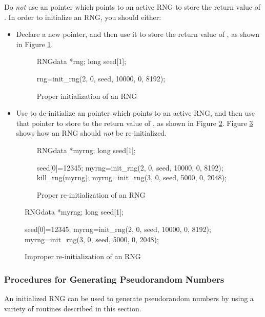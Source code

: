 Do {\em not} use an  pointer which points to an active RNG
to store the return value of .  In order to initialize an
RNG, you should either:
\begin{itemize}
\item Declare a new  pointer, and then use it to store the
return value of , as shown in Figure \ref{fig:properinit}.

\begin{figure}
\begin{example}
RNGdata *rng;
long seed[1];

rng=init_rng(2, 0, seed, 10000, 0, 8192);
\end{example}
\caption{Proper initialization of an RNG}
\label{fig:properinit}
\end{figure}

\item Use  to de-initialize an  pointer
which points to an active RNG, and then use that pointer to store to the
return value of , as shown in Figure
\ref{fig:properreinit}.  Figure \ref{fig:improperreinit} shows how an
RNG should {\em not} be re-initialized.
\begin{figure}
\begin{example}
RNGdata *myrng;
long seed[1];

seed[0]=12345;
myrng=init_rng(2, 0, seed, 10000, 0, 8192);
kill_rng(myrng);
myrng=init_rng(3, 0, seed, 5000, 0, 2048);
\end{example}
\caption{Proper re-initialization of an RNG}
\label{fig:properreinit}
\end{figure}
\end{itemize}

\begin{figure}
\begin{example}
RNGdata *myrng;
long seed[1];

seed[0]=12345;
myrng=init_rng(2, 0, seed, 10000, 0, 8192);
myrng=init_rng(3, 0, seed, 5000, 0, 2048);
\end{example}
\caption{Improper re-initialization of an RNG}
\label{fig:improperreinit}
\end{figure}

\subsubsection{Procedures for Generating Pseudorandom Numbers}
\label{sec:genproc}
An initialized RNG can be used to generate pseudorandom
numbers by using a variety of routines described in this section.

